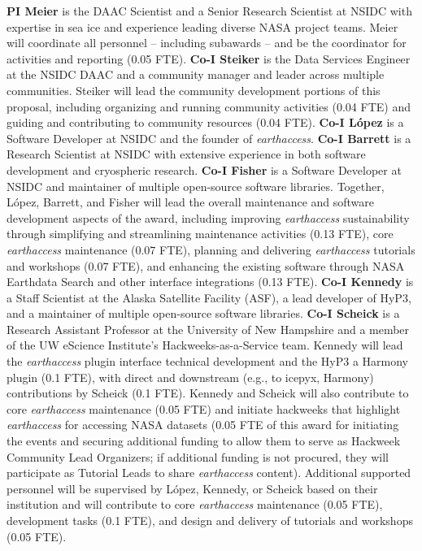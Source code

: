 \documentclass{ROSES-NASA-proposal}
\newcommand{\earthaccess}{\textit{earthaccess}\xspace} %
\begin{document}
\textbf{PI Meier} is the DAAC Scientist and a Senior Research Scientist at NSIDC with expertise in sea ice and experience leading diverse NASA project teams. Meier will coordinate all personnel -- including subawards -- and be the coordinator for activities and reporting (0.05 FTE). \textbf{Co-I Steiker} is the Data Services Engineer at the NSIDC DAAC and a community manager and leader across multiple communities. Steiker will lead the community development portions of this proposal, including organizing and running community activities (0.04 FTE) and guiding and contributing to community resources (0.04 FTE). \textbf{Co-I López} is a Software Developer at NSIDC and the founder of \earthaccess. \textbf{Co-I Barrett} is a Research Scientist at NSIDC with extensive experience in both software development and cryospheric research. \textbf{Co-I Fisher} is a Software Developer at NSIDC and maintainer of multiple open-source software libraries. Together, López, Barrett, and Fisher will lead the overall maintenance and software development aspects of the award, including improving \earthaccess sustainability through simplifying and streamlining maintenance activities (0.13 FTE), core \earthaccess maintenance (0.07 FTE), planning and delivering \earthaccess tutorials and workshops (0.07 FTE), and enhancing the existing software through NASA Earthdata Search and other interface integrations (0.13 FTE). \textbf{Co-I Kennedy} is a Staff Scientist at the Alaska Satellite Facility (ASF), a lead developer of HyP3, and a maintainer of multiple open-source software libraries. \textbf{Co-I Scheick} is a Research Assistant Professor at the University of New Hampshire and a member of the UW eScience Institute's Hackweeks-as-a-Service team. Kennedy will lead the \earthaccess plugin interface technical development and the HyP3 a Harmony plugin (0.1 FTE), with direct and downstream (e.g., to icepyx, Harmony) contributions by Scheick (0.1 FTE). Kennedy and Scheick will also contribute to core \earthaccess maintenance (0.05 FTE) and initiate hackweeks that highlight \earthaccess for accessing NASA datasets (0.05 FTE of this award for initiating the events and securing additional funding to allow them to serve as Hackweek Community Lead Organizers; if additional funding is not procured, they will participate as Tutorial Leads to share \earthaccess content). Additional supported personnel will be supervised by López, Kennedy, or Scheick based on their institution and will contribute to core \earthaccess maintenance (0.05 FTE), development tasks (0.1 FTE), and design and delivery of tutorials and workshops (0.05 FTE).
\end{document}
